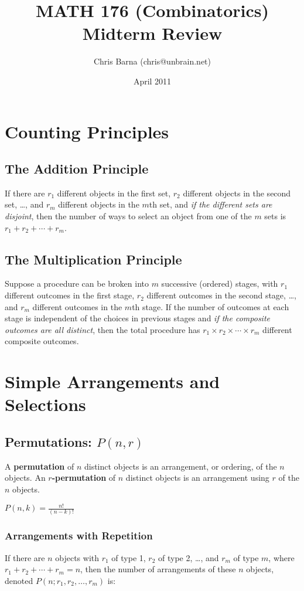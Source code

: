 \documentclass{article}
\begin{document}
\title{MATH 176 (Combinatorics) Midterm Review}
\author{Chris Barna (chris@unbrain.net)}
\date{April 2011}
\maketitle

\section{Counting Principles}

\subsection{The Addition Principle}
If there are $r_1$ different objects in the first set, $r_2$ different
objects in the second set, \dots, and $r_m$ different objects in the
$m$th set, and \emph{if the different sets are disjoint}, then the
number of ways to select an object from one of the $m$ sets is
$r_1+r_2+\cdots+r_m$.

\subsection{The Multiplication Principle}
Suppose a procedure can be broken into $m$ successive (ordered) stages,
with $r_1$ different outcomes in the first stage, $r_2$ different
outcomes in the second stage, \dots, and $r_m$ different outcomes in the
$m$th stage. If the number of outcomes at each stage is independent of
the choices in previous stages and \emph{if the composite outcomes are
all distinct}, then the total procedure has $r_1\times r_2 \times \cdots
\times r_m$ different composite outcomes.

\section{Simple Arrangements and Selections}
\subsection{Permutations: $P(n,r)$}
A \textbf{permutation} of $n$ distinct objects is an arrangement, or
ordering, of the $n$ objects. An \textbf{$r$-permutation} of $n$
distinct objects is an arrangement using $r$ of the $n$ objects.
\begin{center}
$P(n,k) = \frac{n!}{(n-k)!}$
\end{center}

\subsubsection{Arrangements with Repetition}
If there are $n$ objects with $r_1$ of type 1, $r_2$ of type 2, \dots,
and $r_m$ of type $m$, where $r_1 + r_2 + \cdots + r_m = n$, then the
number of arrangements of these $n$ objects, denoted $P(n; r_1,
r_2,\dots,r_m)$ is:
\end{document}

